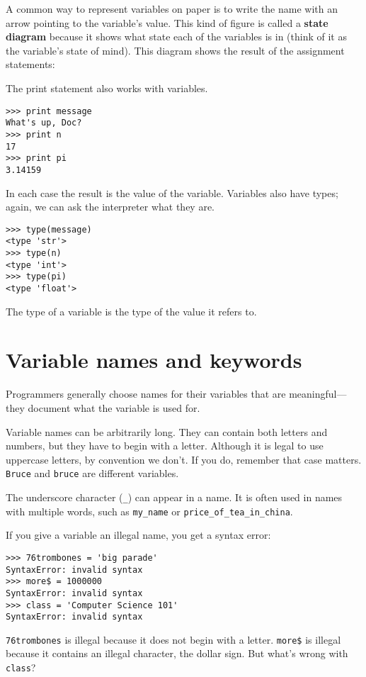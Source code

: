
A common way to represent variables on paper is to write the name with
an arrow pointing to the variable's value.  This kind of figure is
called a {\bf state diagram} because it shows what state each of the
variables is in (think of it as the variable's state of mind).
This diagram shows the result of the assignment statements:

\beforefig
\centerline{}
\afterfig

The print statement also works with variables.

\beforeverb
\begin{verbatim}
>>> print message
What's up, Doc?
>>> print n
17
>>> print pi
3.14159
\end{verbatim}
\afterverb
%
In each case the result is the value of the variable.
Variables also have types; again, we can ask the
interpreter what they are.

\beforeverb
\begin{verbatim}
>>> type(message)
<type 'str'>
>>> type(n)
<type 'int'>
>>> type(pi)
<type 'float'>
\end{verbatim}
\afterverb
%
The type of a variable is the type of the value it
refers to.


\section{Variable names and keywords}

Programmers generally choose names for their variables that
are meaningful---they document what the variable is used for.

Variable names can be arbitrarily long.  They can contain
both letters and numbers, but they have to begin with a letter.
Although it is legal to use uppercase letters, by convention
we don't.  If you do, remember that case matters.  {\tt Bruce}
and {\tt bruce} are different variables.

The underscore character ({\tt \_}) can appear in a name.
It is often used in names with multiple words, such as
{\tt my\_name} or {\tt price\_of\_tea\_in\_china}.


If you give a variable an illegal name, you get a syntax error:

\pagebreak
\beforeverb
\begin{verbatim}
>>> 76trombones = 'big parade'
SyntaxError: invalid syntax
>>> more$ = 1000000
SyntaxError: invalid syntax
>>> class = 'Computer Science 101'
SyntaxError: invalid syntax
\end{verbatim}
\afterverb
%
{\tt 76trombones} is illegal because it does not begin with a letter.
{\tt more\$} is illegal because it contains an illegal character, the dollar
sign.  But what's wrong with {\tt class}?

